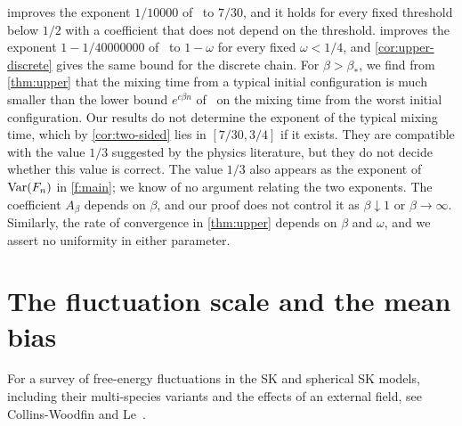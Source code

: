  improves the exponent $1/10000$ of~\cite{oai-barriers}
to $7/30$, and it holds for every fixed threshold below $1/2$ with a
coefficient that does not depend on the threshold.  improves
the exponent $1-1/40000000$ of~\cite{oai-typical-upper} to $1-\omega$ for
every fixed $\omega<1/4$, and \cref{cor:upper-discrete} gives the same bound
for the discrete chain. For $\beta>\beta_*$, we find from \cref{thm:upper}
that the mixing time from a typical initial configuration is much smaller
than the lower bound
$e^{c\beta n}$ of~\cite{sellke-2025} on the mixing time from the worst initial
configuration. Our results do not determine the exponent of the typical
mixing time, which by \cref{cor:two-sided} lies in $[7/30,3/4]$ if it exists.
They are compatible with the value $1/3$ suggested by the physics literature,
but they do not decide whether this value is correct. The value $1/3$ also
appears as the exponent of $\operatorname{Var}(F_n)$ in \cref{f:main}; we know of no
argument relating the two exponents. The coefficient $A_\beta$ depends on
$\beta$, and our proof does not control it as $\beta\downarrow1$ or
$\beta\to\infty$. Similarly, the rate of convergence in \cref{thm:upper}
depends on $\beta$ and $\omega$, and we assert no uniformity in either
parameter.

\section{The fluctuation scale and the mean bias}\label{sec:intro-fluct}

For a survey of free-energy fluctuations in the SK and spherical SK models,
including their multi-species variants and the effects of an external field,
see Collins-Woodfin and Le~\cite{collins-woodfin-le-survey-2025}.

